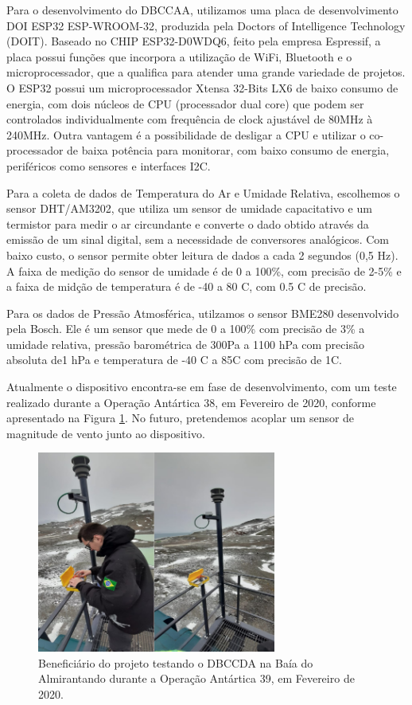\documentclass{article}
\begin{document}
Para o desenvolvimento do DBCCAA, utilizamos uma placa de desenvolvimento DOI ESP32 ESP-WROOM-32, produzida pela Doctors of Intelligence Technology (DOIT). 
Baseado no CHIP ESP32-D0WDQ6, feito pela empresa Espressif, a placa possui funções que incorpora a utilização de WiFi, Bluetooth e o microprocessador, 
que a qualifica para atender uma grande variedade de projetos. O ESP32 possui um microprocessador Xtensa 32-Bits LX6 de baixo consumo de
energia, com dois núcleos de CPU (processador dual core) que podem ser controlados individualmente com frequência de clock ajustável de 80MHz à 240MHz. 
Outra vantagem é a possibilidade de desligar a CPU e utilizar o co-processador de baixa potência para monitorar, com baixo consumo de energia, periféricos 
como sensores e interfaces I2C.
\bigskip

Para a coleta de dados de Temperatura do Ar e Umidade Relativa, escolhemos o sensor DHT/AM3202, que utiliza um sensor
de umidade capacitativo e um termistor para medir o ar circundante e converte o dado obtido através da emissão de um sinal digital, sem a necessidade de
conversores analógicos. Com baixo custo, o sensor permite obter leitura de dados a cada 2 segundos (0,5 Hz). A faixa de medição do sensor de umidade é de 
0 a 100\%, com precisão de 2-5\% e a faixa de midção de temperatura é de -40 a 80 \textdegree{}C, com 0.5 \textdegree{}C de
precisão.
\bigskip

Para os dados de Pressão Atmosférica, utilzamos o sensor BME280 desenvolvido pela Bosch. Ele é um sensor que mede de 0 a 100\%
com precisão de 3\% a umidade relativa, pressão barométrica de 300Pa a 1100 hPa com precisão absoluta de1 hPa e temperatura de -40 \textdegree{}C a 
85\textdegree{}C com precisão de 1\textdegree{}C.
\bigskip

Atualmente o dispositivo encontra-se em fase de desenvolvimento, com um teste realizado durante a Operação Antártica 38, em Fevereiro de 2020, 
conforme apresentado na \textcolor{bleu_cite}{Figura \ref{dbccda}}. No futuro, pretendemos acoplar um sensor de magnitude de vento junto ao dispositivo.

\bigskip

\begin{figure}[H]
    \centering
    \includegraphics[width=0.70\textwidth]{img/dbccda.png}
	\caption{Beneficiário do projeto testando o DBCCDA na Baía do Almirantando durante a Operação Antártica 39, em Fevereiro de 2020.}
	\label{dbccda}
\end{figure}
\bigskip
\end{document}
